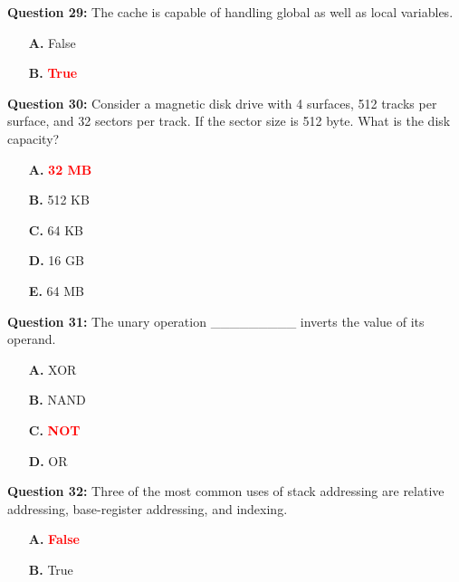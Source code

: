 \documentclass[12pt,a4paper]{article}
\begin{document}
\vspace{0.5cm}

\textbf{Question 29:} The cache is capable of handling global as well as local variables.

\begin{itemize}
    \item[\textbf{A.}] False
    \item[\textbf{B.}] \textcolor{red}{\textbf{True}}
\end{itemize}

\vspace{0.5cm}

\textbf{Question 30:} Consider a magnetic disk drive with 4 surfaces, 512 tracks per surface, and 32 sectors per track. If the sector size is 512 byte. What is the disk capacity?

\begin{itemize}
    \item[\textbf{A.}] \textcolor{red}{\textbf{32 MB}}
    \item[\textbf{B.}] 512 KB
    \item[\textbf{C.}] 64 KB
    \item[\textbf{D.}] 16 GB
    \item[\textbf{E.}] 64 MB
\end{itemize}

\vspace{0.5cm}

\textbf{Question 31:} The unary operation _________ inverts the value of its operand.

\begin{itemize}
    \item[\textbf{A.}] XOR
    \item[\textbf{B.}] NAND
    \item[\textbf{C.}] \textcolor{red}{\textbf{NOT}}
    \item[\textbf{D.}] OR
\end{itemize}

\vspace{0.5cm}

\textbf{Question 32:} Three of the most common uses of stack addressing are relative addressing, base-register addressing, and indexing.

\begin{itemize}
    \item[\textbf{A.}] \textcolor{red}{\textbf{False}}
    \item[\textbf{B.}] True
\end{itemize}
\end{document}
